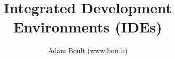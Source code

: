 \documentclass[oneside]{book}
\begin{document}
\author{Adam Boult (www.bou.lt)}
\title{Integrated Development Environments (IDEs)}
\maketitle

\setcounter{tocdepth}{0}
\tableofcontents


\end{document}
